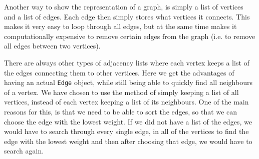 Another way to show the representation of a graph, is simply a list of vertices and a list of edges. 
Each edge then simply stores what vertices it connects. 
This makes it very easy to loop through all edges, but at the same time makes it computationally expensive to remove certain edges from the graph (i.e. 
to remove all edges between two vertices).

There are always other types of adjacency lists where each vertex keeps a list of the edges connecting them to other vertices. Here we get the advantages of having an actual \lstinline|Edge| object, while still being able to quickly find all neighbours of a vertex.
We have chosen to use the method of simply keeping a list of all vertices, instead of each vertex keeping a list of its neighbours. One of the main reasons for this, is that we need to be able to sort the edges, so that we can choose the edge with the lowest weight. If we did not have a list of the edges, we would have to search through every single edge, in all of the vertices to find the edge with the lowest weight and then after choosing that edge, we would have to search again.

